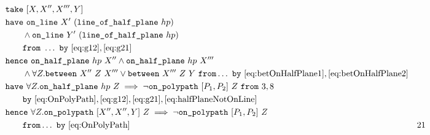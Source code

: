 \begin{boxedfigure}
\small
\begin{align*}
  &\code{take}\ [X,X'',X''',Y]\\
  &\code{have}\ \code{on\_line}\ X'\ (\code{line\_of\_half\_plane}\ hp)\\
  &\qquad\wedge \code{on\_line}\ Y'\ (\code{line\_of\_half\_plane}\ hp)\\
  &\qquad\code{from}\ \ldots\ \code{by}\ \eqref{eq:g12},\eqref{eq:g21}\\
  &\code{hence}\ \code{on\_half\_plane}\ hp\ X'' \wedge \code{on\_half\_plane}\ hp\ X'''\\
  &\qquad\wedge\forall Z. \between{X''}{Z}{X'''} \vee \between{X'''}{Z}{Y}\ \code{from} \ldots\ \code{by}\ \eqref{eq:betOnHalfPlane1},\eqref{eq:betOnHalfPlane2}\\
  &\code{have}\ \forall Z. \code{on\_half\_plane}\ hp\ Z \implies \neg\code{on\_polypath}\ [P_1,P_2]\ Z\
  \code{from}\ 3,8\\
  &\qquad\code{by}\ \eqref{eq:OnPolyPath},\eqref{eq:g12},\eqref{eq:g21},\eqref{eq:halfPlaneNotOnLine}\\
  &\code{hence}\ \forall Z. \code{on\_polypath}\ [X'',X'',Y]\ Z \implies \neg\code{on\_polypath}\ [P_1,P_2]\ Z\\
  &\qquad\code{from} \ldots\ \code{by}\ \eqref{eq:OnPolyPath}\ & 21\\

\end{align*}
\end{boxedfigure}

